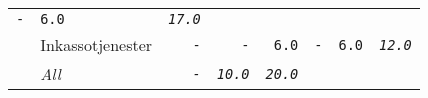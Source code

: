 \documentclass[11pt,A4paper,]{article}
\begin{document}
\begin{longtable}[]{@{}llrrrrrr@{}}
\begin{minipage}[t]{0.12\columnwidth}
\texttt{-}\strut
\end{minipage} & \begin{minipage}[t]{0.12\columnwidth}\raggedleft\strut
\texttt{6.0}\strut
\end{minipage} & \begin{minipage}[t]{0.12\columnwidth}\raggedleft\strut
\emph{\texttt{17.0}}\strut
\end{minipage}\tabularnewline
\begin{minipage}[t]{0.12\columnwidth}\raggedright\strut
\strut
\end{minipage} & \begin{minipage}[t]{0.12\columnwidth}\raggedright\strut
Inkassotjenester\strut
\end{minipage} & \begin{minipage}[t]{0.12\columnwidth}\raggedleft\strut
\texttt{-}\strut
\end{minipage} & \begin{minipage}[t]{0.12\columnwidth}\raggedleft\strut
\texttt{-}\strut
\end{minipage} & \begin{minipage}[t]{0.12\columnwidth}\raggedleft\strut
\texttt{6.0}\strut
\end{minipage} & \begin{minipage}[t]{0.12\columnwidth}\raggedleft\strut
\texttt{-}\strut
\end{minipage} & \begin{minipage}[t]{0.12\columnwidth}\raggedleft\strut
\texttt{6.0}\strut
\end{minipage} & \begin{minipage}[t]{0.12\columnwidth}\raggedleft\strut
\emph{\texttt{12.0}}\strut
\end{minipage}\tabularnewline
\begin{minipage}[t]{0.12\columnwidth}\raggedright\strut
\strut
\end{minipage} & \begin{minipage}[t]{0.12\columnwidth}\raggedright\strut
\emph{All}\strut
\end{minipage} & \begin{minipage}[t]{0.12\columnwidth}\raggedleft\strut
\emph{\texttt{-}}\strut
\end{minipage} & \begin{minipage}[t]{0.12\columnwidth}\raggedleft\strut
\emph{\texttt{10.0}}\strut
\end{minipage} & \begin{minipage}[t]{0.12\columnwidth}\raggedleft\strut
\emph{\texttt{20.0}}\strut

\end{minipage}
\end{longtable}
\end{document}
